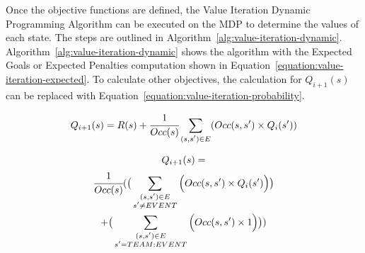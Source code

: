 \documentclass[]{article}
\begin{document}

Once the objective functions are defined, the Value Iteration Dynamic Programming Algorithm can be executed on the MDP to determine the values of each state. The steps are outlined in Algorithm~\ref{alg:value-iteration-dynamic}. Algorithm~\ref{alg:value-iteration-dynamic} shows the algorithm with the Expected Goals or Expected Penalties computation shown in Equation~\ref{equation:value-iteration-expected}. To calculate other objectives, the calculation for $Q_{i+1}(s)$ can be replaced with Equation~\ref{equation:value-iteration-probability}.%

\begin{equation}
\label{equation:value-iteration-expected}
Q_{i+1}(s) = R(s) + \cfrac{1}{Occ(s)}\sum_{\substack{(s,s') \in E}}(Occ(s,s')\times Q_{i}(s'))
\end{equation}

\begin{multline}
\label{equation:value-iteration-probability}
Q_{i+1}(s) = \\
\cfrac{1}{Occ(s)}(\big(\sum_{\substack{(s,s') \in E \\ s' \neq EVENT}}\Big(Occ(s,s') \times Q_{i}(s')\Big)\big) \\
+ \big(\sum_{\substack{(s,s') \in E \\ s' = TEAM:EVENT}}\Big(Occ(s,s') \times 1\Big)\big))
\end{multline}

\end{document}
